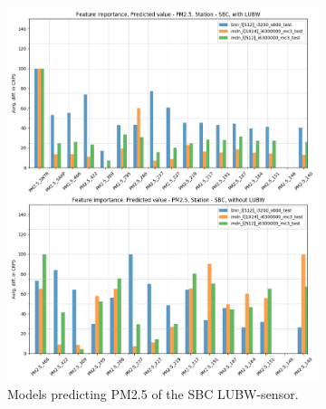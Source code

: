 \documentclass[12pt,a4paper,twoside]{scrartcl}
\numberwithin{equation}{section}
\begin{document}
\begin{figure}[H]
  \centering
  \begin{subfigure}[t]{0.49\textwidth}
    \includegraphics[width=\textwidth,height=1.2\textwidth]{figures/figs_1h/feature_importance_CRPS_SBC_P2}%
    \caption{Models predicting PM2.5 of the SBC LUBW-sensor.}
  \end{subfigure}
  \begin{subfigure}[t]{0.49\textwidth}

\end{subfigure}
\end{figure}
\end{document}
